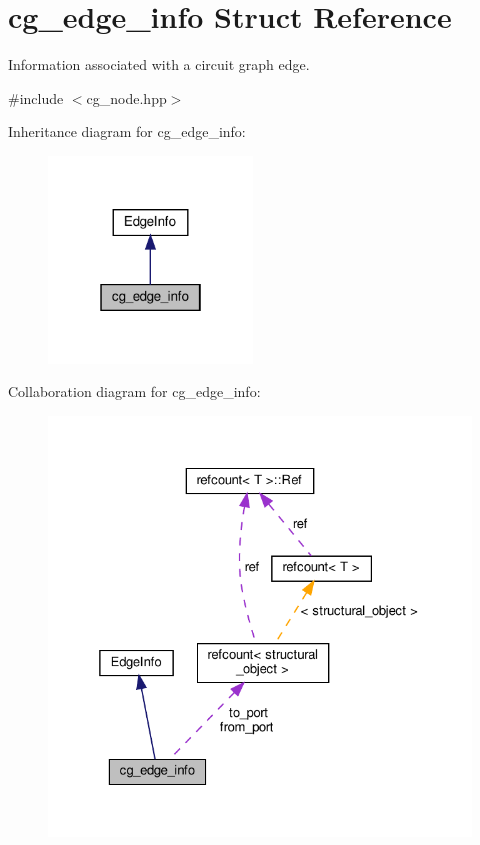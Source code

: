 \hypertarget{structcg__edge__info}{}\section{cg\+\_\+edge\+\_\+info Struct Reference}
\label{structcg__edge__info}


Information associated with a circuit graph edge.  




{\ttfamily \#include $<$cg\+\_\+node.\+hpp$>$}



Inheritance diagram for cg\+\_\+edge\+\_\+info\+:
\nopagebreak
\begin{figure}[H]
\begin{center}
\leavevmode
\includegraphics[width=154pt]{d0/d73/structcg__edge__info__inherit__graph}
\end{center}
\end{figure}


Collaboration diagram for cg\+\_\+edge\+\_\+info\+:
\nopagebreak
\begin{figure}[H]
\begin{center}
\leavevmode
\includegraphics[width=325pt]{d7/d7a/structcg__edge__info__coll__graph}
\end{center}
\end{figure}
